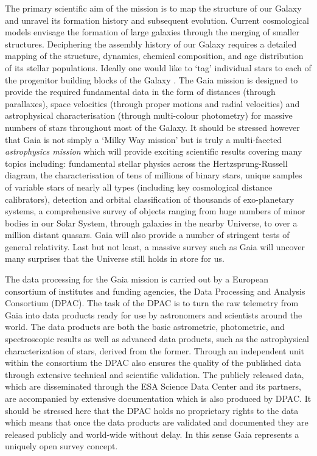 The primary scientific aim of the mission is to map the structure of our Galaxy and unravel its formation history and subsequent evolution. Current cosmological models envisage the formation of large galaxies through the merging of smaller structures. Deciphering the assembly history of our Galaxy requires a detailed mapping of the structure, dynamics, chemical composition, and age distribution of its stellar populations. Ideally one would like to `tag' individual stars to each of the progenitor building blocks of the Galaxy \cite{2002ARA&A..40..487F}. The Gaia mission is designed to provide the required fundamental data in the form of distances (through parallaxes), space velocities (through proper motions and radial velocities) and astrophysical characterisation (through multi-colour photometry) for massive numbers of stars throughout most of the Galaxy. It should be stressed however that Gaia is not simply a `Milky Way mission' but is truly a multi-faceted {\em astrophysics mission} which will provide exciting scientific results covering many topics including: fundamental stellar physics across the Hertzsprung-Russell diagram, the characterisation of tens of millions of binary stars, unique samples of variable stars of nearly all types (including key cosmological distance calibrators), detection and orbital classification of thousands of exo-planetary systems, a comprehensive survey of objects ranging from huge numbers of minor bodies in our Solar System, through galaxies in the nearby Universe, to over a million distant quasars. Gaia will also provide a number of stringent tests of general relativity. Last but not least, a massive survey such as Gaia will uncover many surprises that the Universe still holds in store for us.

The data processing for the Gaia mission is carried out by a European consortium of institutes and funding agencies, the Data Processing and Analysis Consortium (DPAC). The task of the DPAC is to turn the raw telemetry from Gaia into data products ready for use by astronomers and scientists around the world. The data products are both the basic astrometric, photometric, and spectroscopic results as well as advanced data products, such as the astrophysical characterization of stars, derived from the former. Through an independent unit within the consortium the DPAC also ensures the quality of the published data through extensive technical and scientific validation. The publicly released data, which are disseminated through the ESA Science Data Center and its partners, are accompanied by extensive documentation which is also produced by DPAC. It should be stressed here that the DPAC holds no proprietary rights to the data which means that once the data products are validated and documented they are released publicly and world-wide without delay. In this sense Gaia represents a uniquely open survey concept.

